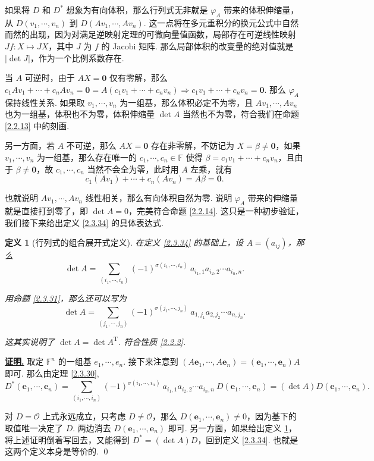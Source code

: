 \documentclass[10pt,openany]{article}
\theoremstyle{thmstyle} %
\theoremstyle{defstyle} %
\newtheorem{definition}[theorem]{定义}
\theoremstyle{prostyle} %
\theoremstyle{exastyle}
\theoremstyle{remstyle}
\renewenvironment{proof}[1][证明]{\par\underline{\textbf{#1.}} \;\fangsong}{\qed\par}
\newcommand{\T}{^{\text{T}}}
\newcommand{\F}{\mathbb{F}}
\newcommand{\bme}{\bm{e}}
\begin{document}
如果将 \( D \) 和 \( D^* \) 想象为有向体积，那么行列式无非就是 \( \varphi_{A} \) 带来的体积伸缩量，从 \( D(v_1,\cdots,v_n) \) 到 \( D(Av_1,\cdots,Av_n) \). 这一点将在多元重积分的换元公式中自然而然的出现，因为对满足逆映射定理的可微向量值函数，局部存在可逆线性映射 \( Jf: X \mapsto JX \)，其中 \( J \) 为 \( f \) 的 Jacobi 矩阵. 那么局部体积的改变量的绝对值就是 \( |\det J| \)，作为一个比例系数存在.

当 \( A \) 可逆时，由于 \( AX=\bm{0} \) 仅有零解，那么 \( c_1Av_1+\cdots+c_nAv_n= \bm{0}= A(c_1v_1+\cdots+c_nv_n) \Rightarrow c_1v_1+\cdots+c_nv_n=\bm{0} \). 那么 \( \varphi_{A} \) 保持线性关系. 如果取 \( v_1,\cdots,v_n \) 为一组基，那么体积必定不为零，且 \( Av_1,\cdots,Av_n \) 也为一组基，体积也不为零，体积伸缩量 \( \det A \) 当然也不为零，符合我们在命题 \ref{2.2.13} 中的刻画. 


另一方面，若 \( A \) 不可逆，那么 \( AX=\bm{0} \) 存在非零解，不妨记为 \( X=\beta \neq \bm{0} \)，如果 \( v_1,\cdots,v_n \) 为一组基，那么存在唯一的 \( c_1,\cdots,c_n \in \F \) 使得 \( \beta=c_1v_1+\cdots+c_nv_n \)，且由于 \( \beta \neq \bm{0} \)，故 \( c_1,\cdots,c_n \) 当然不会全为零，此时用 \( A \) 左乘，就有
\[ c_1(Av_1)+\cdots+c_n(Av_n)=A\beta=\bm{0}. \]

也就说明 \( Av_1,\cdots,Av_n \) 线性相关，那么有向体积自然为零. 说明 \( \varphi_{A} \) 带来的伸缩量就是直接打到零了，即 \( \det A=0 \)，完美符合命题 \ref{2.2.14}. 这只是一种初步验证，我们接下来给出定义 \ref{2.3.34} 的具体表达式.

\begin{definition}[行列式的组合展开式定义] \label{2.3.35}
	在定义 \ref{2.3.34} 的基础上，设 \( A=(a_{ij}) \)，那么
	\[ \det A= \sum_{(i_1,\cdots,i_n)}^{} (-1)^{\sigma(i_1,\cdots,i_n)} \ a_{i_1,1}a_{i_2,2}\cdots a_{i_n,n}. \]
	
	用命题 \ref{2.3.31}，那么还可以写为
	\[ \det A= \sum_{(j_1,\cdots,j_n)}^{} (-1)^{\sigma(j_1,\cdots,j_n)} \ a_{1,j_1}a_{2,j_2}\cdots a_{n,j_n}. \]
	
	这其实说明了 \( \det A=\det A\T \). 符合性质 \ref{2.2.2}. 
\end{definition}

\begin{proof}
	取定 \( \F^n \) 的一组基 \( e_1,\cdots,e_n \). 接下来注意到 \( (A\bme_1,\cdots,A\bme_n)=(\bme_1,\cdots,\bme_n)A \) 即可. 那么由定理 \ref{2.3.30},
	\[ D^*(\bme_1,\cdots,\bme_n)=\sum_{(i_1,\cdots,i_n)}^{} (-1)^{\sigma(i_1,\cdots,i_n)} \ a_{i_1,1}a_{i_2,2}\cdots a_{i_n,n} \ D(\bme_1,\cdots,\bme_n)=(\det A) D(\bme_1,\cdots,\bme_n). \]
	
	对 \( D = \mathcal{O} \) 上式永远成立，只考虑 \( D \neq \mathcal{O} \)，那么 \( D(\bme_1,\cdots,\bme_n) \neq 0 \)，因为基下的取值唯一决定了 \( D \). 两边消去 \( D(\bme_1,\cdots,\bme_n) \) 即可. 另一方面，如果给出定义 \ref{2.3.35}，将上述证明倒着写回去，又能得到 \( D^*=(\det A) D \)，回到定义 \ref{2.3.34}. 也就是这两个定义本身是等价的.
\end{proof}
\end{document}
